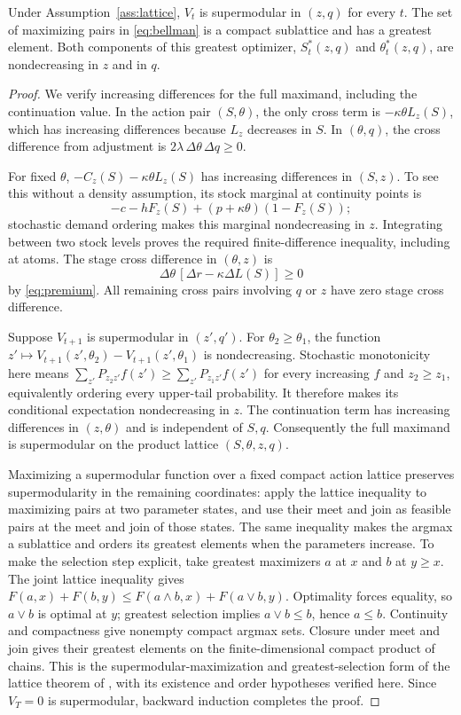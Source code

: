 \begin{theorem}\label{thm:lattice}
Under Assumption~\ref{ass:lattice}, $V_t$ is supermodular in $(z,q)$ for every $t$. The set of maximizing pairs in \eqref{eq:bellman} is a compact sublattice and has a greatest element. Both components of this greatest optimizer, $S_t^*(z,q)$ and $\theta_t^*(z,q)$, are nondecreasing in $z$ and in $q$.
\end{theorem}
\begin{proof}
We verify increasing differences for the full maximand, including the continuation value. In the action pair $(S,\theta)$, the only cross term is $-\kappa\theta L_z(S)$, which has increasing differences because $L_z$ decreases in $S$. In $(\theta,q)$, the cross difference from adjustment is $2\lambda\,\Delta\theta\,\Delta q\geq0$.

For fixed $\theta$, $-C_z(S)-\kappa\theta L_z(S)$ has increasing differences in $(S,z)$. To see this without a density assumption, its stock marginal at continuity points is
\[
 -c-hF_z(S)+(p+\kappa\theta)(1-F_z(S));
\]
stochastic demand ordering makes this marginal nondecreasing in $z$. Integrating between two stock levels proves the required finite-difference inequality, including at atoms. The stage cross difference in $(\theta,z)$ is
\[
 \Delta\theta\,[\Delta r-\kappa\Delta L(S)]\geq0
\]
by \eqref{eq:premium}. All remaining cross pairs involving $q$ or $z$ have zero stage cross difference.

Suppose $V_{t+1}$ is supermodular in $(z',q')$. For $\theta_2\geq\theta_1$, the function $z'\mapsto V_{t+1}(z',\theta_2)-V_{t+1}(z',\theta_1)$ is nondecreasing. Stochastic monotonicity here means $\sum_{z'}P_{z_2z'}f(z')\geq\sum_{z'}P_{z_1z'}f(z')$ for every increasing $f$ and $z_2\geq z_1$, equivalently ordering every upper-tail probability. It therefore makes its conditional expectation nondecreasing in $z$. The continuation term has increasing differences in $(z,\theta)$ and is independent of $S,q$. Consequently the full maximand is supermodular on the product lattice $(S,\theta,z,q)$.

Maximizing a supermodular function over a fixed compact action lattice preserves supermodularity in the remaining coordinates: apply the lattice inequality to maximizing pairs at two parameter states, and use their meet and join as feasible pairs at the meet and join of those states. The same inequality makes the argmax a sublattice and orders its greatest elements when the parameters increase. To make the selection step explicit, take greatest maximizers $a$ at $x$ and $b$ at $y\geq x$. The joint lattice inequality gives
$F(a,x)+F(b,y)\leq F(a\wedge b,x)+F(a\vee b,y)$.
Optimality forces equality, so $a\vee b$ is optimal at $y$; greatest selection implies $a\vee b\leq b$, hence $a\leq b$. Continuity and compactness give nonempty compact argmax sets. Closure under meet and join gives their greatest elements on the finite-dimensional compact product of chains. This is the supermodular-maximization and greatest-selection form of the lattice theorem of \citet{Topkis1978}, with its existence and order hypotheses verified here. Since $V_T=0$ is supermodular, backward induction completes the proof.\end{proof}

